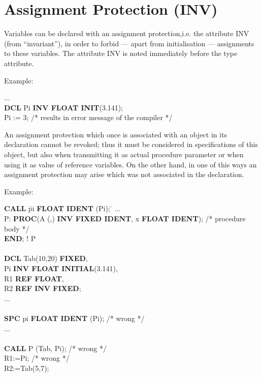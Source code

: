 \section{Assignment Protection (INV)}    %
\label{sec_inv}

Variables can be declared with an assignment protection,i.e. the attribute
INV (from ``invariant''), in order to forbid --- apart from
initialisation --- assignments to these variables. The attribute INV is
noted immediately before the type attribute.

Example:

...\\
{\bf DCL} Pi {\bf INV FLOAT INIT}(3.141);\\

Pi := 3;  /* results in error message of the compiler */

An assignment protection which once is associated with an object in its
declaration cannot be revoked; thus it must be considered in
specifications of this object, but also when transmitting it as actual
procedure parameter or when using it as value of reference variables. On
the other hand, in one of this ways an assignment protection may arise
which was not associated in the declaration.

Example:

\begin{tabbing}
{\bf CALL} \= pi {\bf FLOAT IDENT} (Pi); \= \kill
... \> \> \\
P:  \> {\bf PROC}(A (,) {\bf INV FIXED IDENT}, x {\bf FLOAT IDENT}); /* procedure body */ \> \\
    \> {\bf END}; ! P \> \\
    \> \> \\
{\bf DCL} \> Tab(10,20) {\bf FIXED}, \> \\
          \> Pi {\bf INV FLOAT INITIAL}(3.141), \> \\
          \> R1 {\bf REF FLOAT}, \> \\
          \> R2 {\bf REF INV FIXED}; \> \\
... \> \> \\
    \> \> \\
{\bf SPC} \> pi {\bf FLOAT IDENT} (Pi); \> /* wrong */ \\
... \> \> \\
    \> \> \\
{\bf CALL} \> P (Tab, Pi); \> /* wrong */ \\
R1:=Pi;    \>              \> /* wrong */ \\
R2:=Tab(5,7); \> \>
\end{tabbing}

